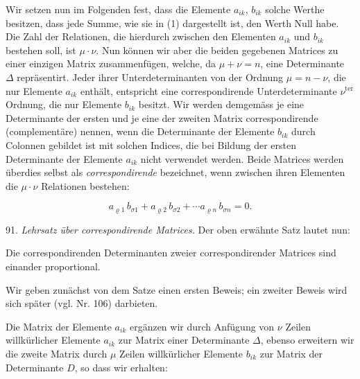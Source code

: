 \documentclass[11pt]{article}
\let\Delta\varDelta
\begin{document}
Wir setzen nun im Folgenden fest, dass die Elemente $a_{ik}$, $b_{ik}$ solche Werthe besitzen, dass jede Summe, wie sie in (1) dargestellt ist, den Werth Null habe. Die Zahl der Relationen, die hierdurch zwischen den Elementen $a_{ik}$ und $b_{ik}$ bestehen soll, ist $\mu\cdot\nu$. Nun können wir aber die beiden gegebenen Matrices zu einer einzigen Matrix zusammenfügen, welche, da $\mu+\nu=n$, eine Determinante $\Delta$ repräsentirt. Jeder ihrer Unterdeterminanten von der Ordnung $\mu=n-\nu$, die nur Elemente $a_{ik}$ enthält, entspricht eine correspondirende Unterdeterminante $\nu^{\mathrm{ter}}$ Ordnung, die nur Elemente $b_{ik}$ besitzt. Wir werden demgemäss je eine Determinante der ersten und je eine der zweiten Matrix correspondirende (complementäre) nennen, wenn die Determinante der Elemente $b_{ik}$ durch Colonnen gebildet ist mit solchen Indices, die bei Bildung der ersten Determinante der Elemente $a_{ik}$ nicht verwendet werden. Beide Matrices werden überdies selbst als \textit{correspondirende} bezeichnet, wenn zwischen ihren Elementen die $\mu\cdot\nu$ Relationen bestehen:

\[
a_{\varrho 1}\, b_{\sigma 1} + a_{\varrho 2}\, b_{\sigma 2} + \cdots a_{\varrho n}\, b_{\sigma n} = 0.
\]

91. \textit{Lehrsatz über correspondirende Matrices.} Der oben erwähnte Satz lautet nun:

\glqq Die correspondirenden Determinanten zweier correspondirender Matrices sind einander proportional.\grqq{}

Wir geben zunächst von dem Satze einen ersten Beweis; ein zweiter Beweis wird sich später (vgl. Nr. 106) darbieten.

Die Matrix der Elemente $a_{ik}$ ergänzen wir durch Anfügung von $\nu$ Zeilen willkürlicher Elemente $a_{ik}$ zur Matrix einer Determinante $\Delta$, ebenso erweitern wir die zweite Matrix durch $\mu$ Zeilen willkürlicher Elemente $b_{ik}$ zur Matrix der Determinante $D$, so dass wir erhalten:
\end{document}
